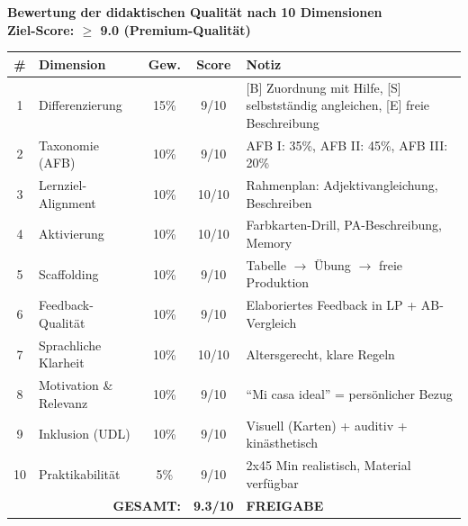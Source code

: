 \documentclass[11pt,a4paper]{article}
\begin{document}
\begin{scorebox}
\textbf{Bewertung der didaktischen Qualität nach 10 Dimensionen}\\
\textbf{Ziel-Score: $\geq$ 9.0 (Premium-Qualität)}

\vspace{1em}
\begin{tabular}{|c|l|c|c|p{4.5cm}|}
\hline
\textbf{\#} & \textbf{Dimension} & \textbf{Gew.} & \textbf{Score} & \textbf{Notiz} \\
\hline
1 & Differenzierung & 15\% & 9/10 & [B] Zuordnung mit Hilfe, [S] selbstständig angleichen, [E] freie Beschreibung \\
\hline
2 & Taxonomie (AFB) & 10\% & 9/10 & AFB I: 35\%, AFB II: 45\%, AFB III: 20\% \\
\hline
3 & Lernziel-Alignment & 10\% & 10/10 & Rahmenplan: Adjektivangleichung, Beschreiben \\
\hline
4 & Aktivierung & 10\% & 10/10 & Farbkarten-Drill, PA-Beschreibung, Memory \\
\hline
5 & Scaffolding & 10\% & 9/10 & Tabelle $\rightarrow$ Übung $\rightarrow$ freie Produktion \\
\hline
6 & Feedback-Qualität & 10\% & 9/10 & Elaboriertes Feedback in LP + AB-Vergleich \\
\hline
7 & Sprachliche Klarheit & 10\% & 10/10 & Altersgerecht, klare Regeln \\
\hline
8 & Motivation \& Relevanz & 10\% & 9/10 & ``Mi casa ideal'' = persönlicher Bezug \\
\hline
9 & Inklusion (UDL) & 10\% & 9/10 & Visuell (Karten) + auditiv + kinästhetisch \\
\hline
10 & Praktikabilität & 5\% & 9/10 & 2x45 Min realistisch, Material verfügbar \\
\hline
\multicolumn{3}{|r|}{\textbf{GESAMT:}} & \textbf{9.3/10} & \textcolor{successgreen}{\textbf{FREIGABE}} \\
\hline
\end{tabular}
\end{scorebox}
\end{document}
